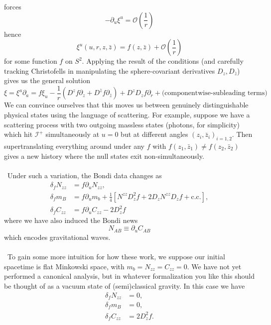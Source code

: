 \documentclass[11pt,letterpaper]{article}
\newcommand{\LP}{\left(}
\newcommand{\RP}{\right)}
\newcommand{\mc}[1]{\mathcal{#1}}
\newcommand{\D}{\partial}
\begin{document}
forces \begin{equation}
- \D_u \xi^u = \mc{O} \LP \frac{1}{r} \RP 
\end{equation}
hence \begin{equation}
\xi^u(u, r, z, \bar{z}) = f(z, \bar{z}) + \mc{O} \LP \frac{1}{r} \RP
\end{equation}
for some function $f$ on $S^2$. Applying the result of the conditions (and carefully tracking Christofells in manipulating the sphere-covariant derivatives $D_z, D_{\bar{z}}$) gives us the general solution \begin{equation}
\xi = \xi^a \D_a = f \xi_u - \frac{1}{r} \LP D^z f \D_z + D^{\bar{z}} f \D_{\bar{z}} \RP + D^z D_z f \D_r + \mbox{(componentwise-subleading terms)}
\end{equation}
We can convince ourselves that this moves us between genuinely distinguishable physical states using the language of scattering. For example, suppose we have a scattering process with two outgoing massless states (photons, for simplicity) which hit $\mc{I}^+$ simultaneously at $u = 0$ but at different angles $(z_i, \bar{z}_i)_{i=1,2}$. Then supertranslating everything around under any $f$ with $f(z_1, \bar{z}_1) \neq f(z_2, \bar{z}_2)$ gives a new history where the null states exit non-simultaneously.\\
\\
\
Under such a variation, the Bondi data changes as \begin{equation}
\begin{aligned}
\delta_f N_{zz} & = f \D_u N_{zz}, \\
\delta_f m_B & = f \D_u m_b + \frac{1}{4} \left[ N^{zz} D_z^2 f + 2 D_z N^{zz} D_z f + \mbox{c.c.} \right], \\
\delta_f C_{zz} & = f \D_u C_{zz} - 2 D_z^2 f
\end{aligned}
\end{equation}
where we have also induced the Bondi news \begin{equation}
N_{AB} \equiv \D_u C_{AB}
\end{equation}
which encodes gravitational waves.\\
\\
\
To gain some more intuition for how these work, we suppose our initial spacetime is flat Minkowski space, with $m_b = N_{zz} = C_{zz} = 0$. We have not yet performed a canonical analysis, but in whatever formalization you like this should be thought of as a vacuum state of (semi)classical gravity. In this case we have \begin{equation}
\begin{aligned}
\delta_f N_{zz} & = 0, \\
\delta_f m_B & = 0, \\
\delta_f C_{zz} & = 2 D_z^2 f.
\end{aligned}
\end{equation}
\end{document}
